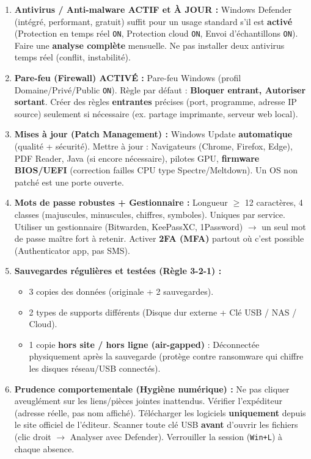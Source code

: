 \documentclass[11pt]{article}
\begin{document}
\begin{methode}
\begin{enumerate}
    \item \textbf{Antivirus / Anti-malware ACTIF et À JOUR :} Windows Defender (intégré, performant, gratuit) suffit pour un usage standard s'il est \textbf{activé} (Protection en temps réel \texttt{ON}, Protection cloud \texttt{ON}, Envoi d'échantillons \texttt{ON}). Faire une \textbf{analyse complète} mensuelle. Ne pas installer deux antivirus temps réel (conflit, instabilité).
    \item \textbf{Pare-feu (Firewall) ACTIVÉ :} Pare-feu Windows (profil Domaine/Privé/Public \texttt{ON}). Règle par défaut : \textbf{Bloquer entrant, Autoriser sortant}. Créer des règles \textbf{entrantes} précises (port, programme, adresse IP source) seulement si nécessaire (ex. partage imprimante, serveur web local).
    \item \textbf{Mises à jour (Patch Management) :} Windows Update \textbf{automatique} (qualité + sécurité). Mettre à jour : Navigateurs (Chrome, Firefox, Edge), PDF Reader, Java (si encore nécessaire), pilotes GPU, \textbf{firmware BIOS/UEFI} (correction failles CPU type Spectre/Meltdown). Un OS non patché est une porte ouverte.
    \item \textbf{Mots de passe robustes + Gestionnaire :} Longueur $\ge$ 12 caractères, 4 classes (majuscules, minuscules, chiffres, symboles). Uniques par service. Utiliser un gestionnaire (Bitwarden, KeePassXC, 1Password) $\rightarrow$ un seul mot de passe maître fort à retenir. Activer \textbf{2FA (MFA)} partout où c'est possible (Authenticator app, pas SMS).
    \item \textbf{Sauvegardes régulières et testées (Règle 3-2-1) :}
    \begin{itemize}
        \item 3 copies des données (originale + 2 sauvegardes).
        \item 2 types de supports différents (Disque dur externe + Clé USB / NAS / Cloud).
        \item 1 copie \textbf{hors site / hors ligne (air-gapped)} : Déconnectée physiquement après la sauvegarde (protège contre ransomware qui chiffre les disques réseau/USB connectés).
    \end{itemize}
    \item \textbf{Prudence comportementale (Hygiène numérique) :} Ne pas cliquer aveuglément sur les liens/pièces jointes inattendus. Vérifier l'expéditeur (adresse réelle, pas nom affiché). Télécharger les logiciels \textbf{uniquement} depuis le site officiel de l'éditeur. Scanner toute clé USB \textbf{avant} d'ouvrir les fichiers (clic droit $\rightarrow$ Analyser avec Defender). Verrouiller la session (\texttt{Win+L}) à chaque absence.
\end{enumerate}
\end{methode}
\end{document}
